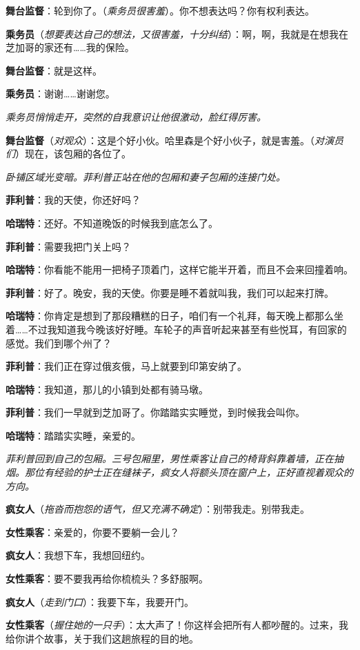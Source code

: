 \documentclass[lang=cn,newtx,12pt,scheme=chinese]{elegantbook}
\begin{document}
\textbf{舞台监督}：轮到你了。（\textit{乘务员很害羞}）。你不想表达吗？你有权利表达。

\textbf{乘务员}（\textit{想要表达自己的想法，又很害羞，十分纠结}）：啊，啊，我就是在想我在芝加哥的家还有……我的保险。

\textbf{舞台监督}：就是这样。

\textbf{乘务员}：谢谢……谢谢您。

\textit{乘务员悄悄走开，突然的自我意识让他很激动，脸红得厉害。}

\textbf{舞台监督}（\textit{对观众}）：这是个好小伙。哈里森是个好小伙子，就是害羞。（\textit{对演员们}）现在，该包厢的各位了。

\textit{卧铺区域光变暗。菲利普正站在他的包厢和妻子包厢的连接门处。}

\textbf{菲利普}：我的天使，你还好吗？

\textbf{哈瑞特}：还好。不知道晚饭的时候我到底怎么了。

\textbf{菲利普}：需要我把门关上吗？

\textbf{哈瑞特}：你看能不能用一把椅子顶着门，这样它能半开着，而且不会来回撞着响。

\textbf{菲利普}：好了。晚安，我的天使。你要是睡不着就叫我，我们可以起来打牌。

\textbf{哈瑞特}：你肯定是想到了那段糟糕的日子，咱们有一个礼拜，每天晚上都那么坐着……不过我知道我今晚该好好睡。车轮子的声音听起来甚至有些悦耳，有回家的感觉。我们到哪个州了？

\textbf{菲利普}：我们正在穿过俄亥俄，马上就要到印第安纳了。

\textbf{哈瑞特}：我知道，那儿的小镇到处都有骑马墩。

\textbf{菲利普}：我们一早就到芝加哥了。你踏踏实实睡觉，到时候我会叫你。

\textbf{哈瑞特}：踏踏实实睡，亲爱的。

\textit{菲利普回到自己的包厢。三号包厢里，男性乘客让自己的椅背斜靠着墙，正在抽烟。那位有经验的护士正在缝袜子，疯女人将额头顶在窗户上，正好直视着观众的方向。}

\textbf{疯女人}（\textit{拖沓而抱怨的语气，但又充满不确定}）：别带我走。别带我走。

\textbf{女性乘客}：亲爱的，你要不要躺一会儿？

\textbf{疯女人}：我想下车，我想回纽约。

\textbf{女性乘客}：要不要我再给你梳梳头？多舒服啊。

\textbf{疯女人}（\textit{走到门口}）：我要下车，我要开门。

\textbf{女性乘客}（\textit{握住她的一只手}）：太大声了！你这样会把所有人都吵醒的。过来，我给你讲个故事，关于我们这趟旅程的目的地。
\end{document}
